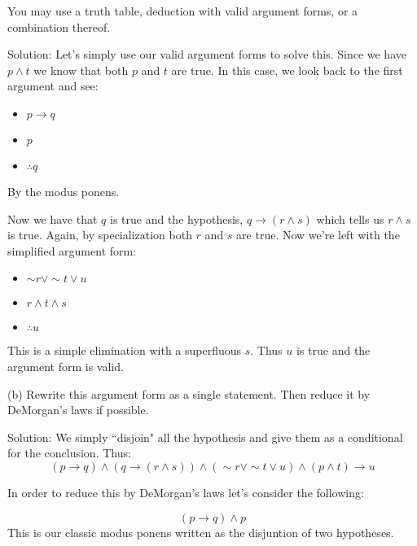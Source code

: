 \documentclass[16 pt]{amsart}
\theoremstyle{definition}
\theoremstyle{remark}
\numberwithin{equation}{subsection}
\begin{document}
You may use a truth table, deduction with valid argument forms, or a combination thereof.\\

\vspace{1in}

Solution:  Let's simply use our valid argument forms to solve this.  Since we have $p\wedge t$ we know that both $p$ and $t$ are true.  In this case, we look back to the first argument and see:\\

\begin{itemize}
\item[] $p\rightarrow q$\\
\item[] $p$\\
\item[] $\therefore q$
\end{itemize}

By the modus ponens.

Now we have that $q$ is true and the hypothesis, $q\rightarrow (r\wedge s)$ which tells us $r\wedge s$ is true.  Again, by specialization both $r$ and $s$ are true.  Now we're left with the simplified argument form:

\begin{itemize}
\item[] $\sim r \vee \sim t \vee u$\\
\item[] $r\wedge t\wedge s$\\
\item[] $\therefore u$
\end{itemize}

This is a simple elimination with a superfluous $s$.  Thus $u$ is true and the argument form is valid.

\vspace{1in}

(b) Rewrite this argument form as a single statement. Then reduce it by DeMorgan's laws if possible.

\vspace{.5in}
 
Solution:
We simply ``disjoin" all the hypothesis and give them as a conditional for the conclusion.  Thus:
\[
(p\rightarrow q)\wedge (q \rightarrow (r\wedge s)) \wedge (\sim r \vee \sim t\vee u)\wedge (p\wedge t) \rightarrow u
\]

In order to reduce this by DeMorgan's laws let's consider the following:

\[
(p\rightarrow q)\wedge p
\]
This is our classic modus ponens written as the disjuntion of two hypotheses.
\end{document}
